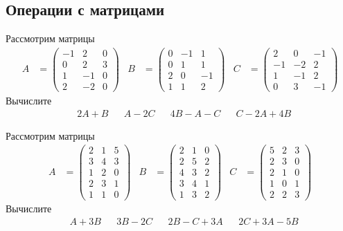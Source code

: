 
\subsection{Операции с матрицами}

\begin{exercise}
Рассмотрим матрицы
\begin{align*}
	A&=\begin{pmatrix}
		-1 & 2 & 0 \\ 0 & 2 & 3 \\ 1 & -1 & 0 \\ 2 & -2 & 0
	\end{pmatrix} &
	B&=\begin{pmatrix}
		0 & -1 & 1 \\ 0 & 1 & 1 \\ 2 & 0 & -1 \\ 1 & 1 & 2
	\end{pmatrix} &
	C&=\begin{pmatrix}
		2 & 0 & -1 \\ -1 & -2 & 2 \\ 1 & -1& 2 \\ 0 & 3 & -1
	\end{pmatrix}
\end{align*}
Вычислите
\begin{align*}
	& 2A+B & &A-2C & &4B-A-C & &C-2A+4B
\end{align*}
\end{exercise}

\begin{exercise}
Рассмотрим матрицы
\begin{align*}
	A&=\begin{pmatrix}
		2 & 1 & 5 \\ 3 & 4 & 3 \\ 1 & 2 & 0 \\ 2 & 3 & 1 \\ 1 & 1 & 0
	\end{pmatrix} &
	B&=\begin{pmatrix}
		2 & 1 & 0 \\ 2 & 5 & 2 \\ 4 & 3 & 2 \\ 3 & 4 & 1 \\ 1 & 3 & 2
	\end{pmatrix} &
	C&=\begin{pmatrix}
		5 & 2 & 3 \\ 2 & 3 & 0 \\ 2 & 1 & 0 \\ 1 & 0 & 1 \\ 2 & 2 & 3
	\end{pmatrix}
\end{align*}
Вычислите
\begin{align*}
	& A+3B & &3B-2C & &2B-C+3A & &2C+3A-5B
\end{align*}
\end{exercise}

